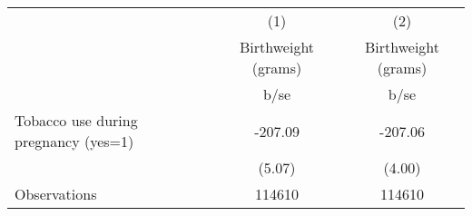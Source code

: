 {
\def\sym#1{\ifmmode^{#1}\else\(^{#1}\)\fi}
\begin{tabular}{l*{2}{c}}
\hline\hline
                                                  &\multicolumn{1}{c}{(1)}&\multicolumn{1}{c}{(2)}\\
                                                  &\multicolumn{1}{c}{Birthweight (grams)}&\multicolumn{1}{c}{Birthweight (grams)}\\
                                                  &        b/se&        b/se\\
\hline
Tobacco use during pregnancy (yes=1)              &     -207.09&     -207.06\\
                                                  &      (5.07)&      (4.00)\\
\hline
Observations                                      &      114610&      114610\\
\hline\hline
\end{tabular}
}
